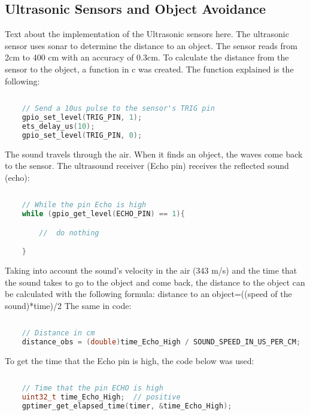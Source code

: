 \documentclass[../report.tex]{subfiles}
\begin{document}
\subsection{Ultrasonic Sensors and Object Avoidance}
Text about the implementation of the Ultrasonic sensors here.
The ultrasonic sensor uses sonar to determine the distance to an object. 
The sensor reads from 2cm to 400 cm with an accuracy of 0.3cm. To calculate
 the distance from the sensor to the object, a function in c was created. 
 The function explained is the following:

 \begin{lstlisting}[language=c,caption={The TRIG pin's Code},label={code:ultrasonic}]
    
    // Send a 10us pulse to the sensor's TRIG pin
    gpio_set_level(TRIG_PIN, 1);
    ets_delay_us(10);
    gpio_set_level(TRIG_PIN, 0);

\end{lstlisting}

The sound travels through the air. When it finds an object, 
the waves come back to the sensor. 
The ultrasound receiver (Echo pin) receives the reflected sound (echo):

\begin{lstlisting}[language=c,caption={The ECHO pin's Code},label={code:ultrasonic}]
    
    // While the pin Echo is high
    while (gpio_get_level(ECHO_PIN) == 1){

        //  do nothing

    }

\end{lstlisting}

Taking into account the sound’s velocity in the air (343 m/s) and the 
time that the sound takes to go to the object and come back, the distance
 to the object can be calculated with the following formula:
distance to an object=((speed of the sound)*time)/2
The same in code:

\begin{lstlisting}[language=c,caption={The distance's Code},label={code:ultrasonic}]
    
    // Distance in cm
    distance_obs = (double)time_Echo_High / SOUND_SPEED_IN_US_PER_CM;


\end{lstlisting}

To get the time that the Echo pin is high, the code below was used:

\begin{lstlisting}[language=c,caption={code to get the time that ECHO is high},label={code:ultrasonic}]
    
    // Time that the pin ECHO is high 
    uint32_t time_Echo_High;  // positive
    gptimer_get_elapsed_time(timer, &time_Echo_High);


\end{lstlisting}
\end{document}
